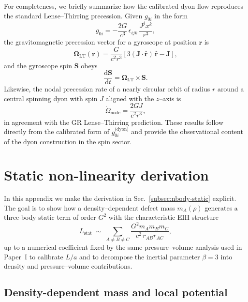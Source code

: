 \documentclass[11pt]{article}
\newcommand{\dd}{\mathrm{d}}
\begin{document}
For completeness, we briefly summarize how the calibrated dyon flow
reproduces the standard Lense--Thirring precession.
Given $g_{0i}$ in the form
\begin{equation}
  g_{0i}
  = -\frac{2G}{c^3}\,
    \epsilon_{ijk}\,\frac{J^j x^k}{r^3},
\end{equation}
the gravitomagnetic precession vector for a gyroscope at position
$\mathbf{r}$ is
\begin{equation}
  \bm{\Omega}_{\text{LT}}(\mathbf{r})
  = \frac{G}{c^2 r^3}
    \left[3(\mathbf{J}\cdot\hat{\mathbf{r}})\,\hat{\mathbf{r}}
          - \mathbf{J}\right],
\end{equation}
and the gyroscope spin $\mathbf{S}$ obeys
\begin{equation}
  \frac{\dd\mathbf{S}}{\dd t}
  = \bm{\Omega}_{\text{LT}}\times\mathbf{S}.
\end{equation}
Likewise, the nodal precession rate of a nearly circular orbit of
radius $r$ around a central spinning dyon with spin $J$ aligned with
the $z$–axis is
\begin{equation}
  \dot{\Omega}_{\text{node}}
  = \frac{2GJ}{c^2 r^3},
\end{equation}
in agreement with the GR Lense--Thirring prediction.
These results follow directly from the calibrated form of
$g_{0i}^{\text{(dyon)}}$ and provide the observational content of the
dyon construction in the spin sector.

\section{Static non-linearity derivation}
\label{app:static-derivation}

In this appendix we make the derivation in
Sec.~\ref{subsec:nbody-static} explicit.
The goal is to show how a density--dependent defect mass
$m_A(\rho)$ generates a three-body static term of order $G^2$ with
the characteristic EIH structure
\begin{equation}
  L_{\text{stat}}
  \;\sim\;
  \sum_{A\neq B\neq C}
  \frac{G^2 m_A m_B m_C}{c^2\, r_{AB} r_{AC}},
\end{equation}
up to a numerical coefficient fixed by the same pressure--volume
analysis used in Paper~I to calibrate $L/a$ and to decompose the
inertial parameter $\beta=3$ into density and pressure--volume
contributions.

\subsection{Density-dependent mass and local potential}
\end{document}
